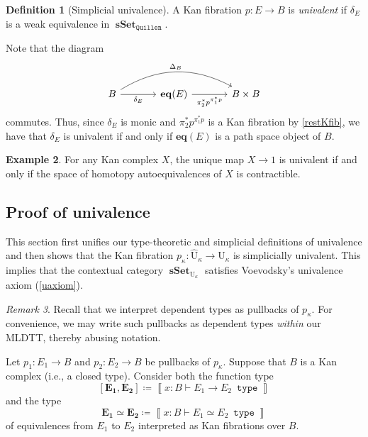 \documentclass[10pt,letterpaper,cm]{nupset}
\theoremstyle{definition}
\newtheorem{definition}{Definition}[subsection]
\newtheorem{exmp}[definition]{Example}
\theoremstyle{theorem}
\theoremstyle{remark}
\newtheorem{remark}[definition]{Remark}
\newcommand{\0}{\mathbf{0}}
\newcommand{\1}{\mathbf{1}}
\newcommand{\2}{\mathbf{2}}
\DeclareMathOperator{\type}{\mathtt{type}}
\DeclareMathOperator{\sset}{\mathbf{sSet}}
\begin{document}
\begin{definition}[Simplicial univalence]
A Kan fibration $p:E\to B$ is \textit{univalent} if $\delta_E$ is a weak equivalence in $\sset_{\mathtt{Quillen}}$.
\end{definition}

Note that the diagram
\[
\begin{tikzcd}[column sep=large]
B \arrow[r, "\delta_{E}"'] \arrow[rr, "\Delta_{B}", bend left] & \mathbf{eq}(E) \arrow[r, "\pi_2^{\ast}{p}^{\pi_1^{\ast}{p}}"'] & B\times B
\end{tikzcd}
\] commutes. Thus, since $\delta_{E}$ is monic and $\pi_2^{\ast}{p}^{\pi_1^{\ast}{p}}$ is a Kan fibration by \cref{restKfib}, we have that $\delta_{E}$ is univalent if and only if $\mathbf{eq}(E)$ is a path space object of $B$.

\begin{exmp}
For any Kan complex $X$, the unique map $X \to 1$ is univalent if and only if the space of homotopy autoequivalences of $X$ is contractible.
\end{exmp}

\subsection{Proof of univalence}\label{fibunivpf}

This section first unifies our type-theoretic and simplicial definitions of univalence and then shows that the Kan fibration $p_{\kappa} : \widehat{\mathrm{U}}_{\kappa} \to \mathrm{U}_{\kappa}$ is simplicially univalent. This implies that the contextual category $\sset_{\mathrm{U}_{\kappa}}$ satisfies Voevodsky's univalence axiom (\cref{uaxiom}).

\smallskip

\begin{remark}
Recall that we interpret  dependent types as pullbacks of  $p_{\kappa}$. For convenience, we may write such pullbacks as  dependent types \emph{within} our MLDTT, thereby abusing notation.
\end{remark}

\bigskip

Let $p_1:E_1 \to B$ and $p_2 : E_2 \to B$ be pullbacks of $p_{\kappa}$. Suppose that $B$ is a Kan complex (i.e., a closed type). Consider both the function type $$\mathbf{\left[E_1, E_2\right]}\coloneqq  \left\llbracket{x: B \vdash {E_1 \to E_2}\ \type}\right\rrbracket$$ and the type $$\mathbf{E_1 \simeq E_2} \coloneqq  \left\llbracket{x: B \vdash {E_1\simeq E_2}\ \type}\right\rrbracket$$ of equivalences from $E_1$ to $E_2$ interpreted as Kan fibrations over $B$.
\end{document}
